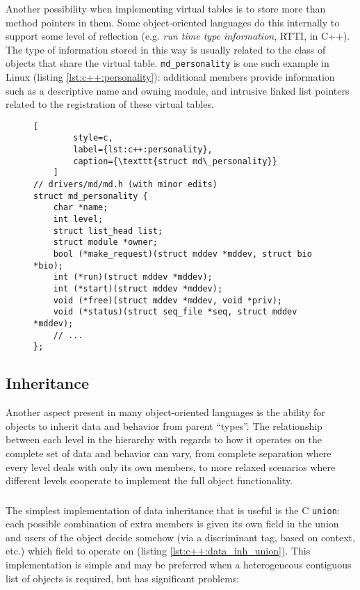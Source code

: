 Another possibility when implementing virtual tables is to store more than
method pointers in them.  Some object-oriented languages do this internally to
support some level of reflection (e.g. \textit{run time type information}, RTTI,
in C++).  The type of information stored in this way is usually related to the
class of objects that share the virtual table.  \texttt{md\_personality} is one
such example in Linux (listing \ref{lst:c++:personality}): additional members
provide information such as a descriptive name and owning module, and intrusive
linked list pointers related to the registration of these virtual tables.

\begin{figure}[ht]
    \begin{lstlisting}[
        style=c,
        label={lst:c++:personality},
        caption={\texttt{struct md\_personality}}
    ]
// drivers/md/md.h (with minor edits)
struct md_personality {
    char *name;
    int level;
    struct list_head list;
    struct module *owner;
    bool (*make_request)(struct mddev *mddev, struct bio *bio);
    int (*run)(struct mddev *mddev);
    int (*start)(struct mddev *mddev);
    void (*free)(struct mddev *mddev, void *priv);
    void (*status)(struct seq_file *seq, struct mddev *mddev);
    // ...
};
    \end{lstlisting}
\end{figure}

\subsection{Inheritance}

Another aspect present in many object-oriented languages is the ability for
objects to inherit data and behavior from parent ``types''.  The relationship
between each level in the hierarchy with regards to how it operates on the
complete set of data and behavior can vary, from complete separation where every
level deals with only its own members, to more relaxed scenarios where different
levels cooperate to implement the full object functionality.

\subsubsection{}

The simplest implementation of data inheritance that is useful is the C
\texttt{union}: each possible combination of extra members is given its own
field in the union and users of the object decide somehow (via a discriminant
tag, based on context, etc.) which field to operate on (listing
\ref{lst:c++:data_inh_union}).  This implementation is simple and may be
preferred when a heterogeneous contiguous list of objects is required, but has
significant problems:


